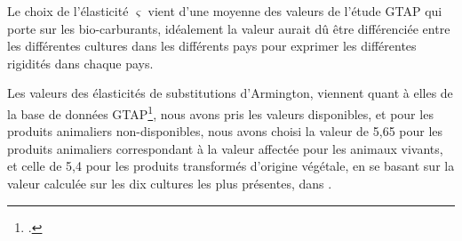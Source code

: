 Le choix de l'élasticité $\varsigma$ vient d'une moyenne des valeurs de l'étude GTAP \cite{Miller2009} qui porte sur les bio-carburants, idéalement la valeur aurait dû être différenciée entre les différentes cultures dans les différents pays pour exprimer les différentes rigidités dans chaque pays.

Les valeurs des élasticités de substitutions d'Armington, viennent quant à elles de la base de données GTAP\footcite{Aguiar2022}, nous avons pris les valeurs disponibles, et pour les produits animaliers non-disponibles, nous avons choisi la valeur de 5,65 pour les produits animaliers correspondant à la valeur affectée pour les animaux vivants, et celle de 5,4 pour les produits transformés d'origine végétale, en se basant sur la valeur calculée sur les dix cultures les plus présentes, dans \cite{Costinot2016}.
